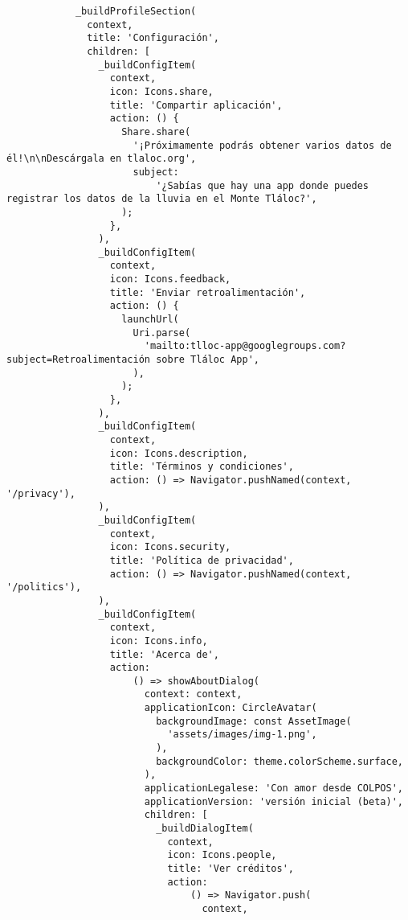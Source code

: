 \begin{verbatim}
            _buildProfileSection(
              context,
              title: 'Configuración',
              children: [ 
                _buildConfigItem(
                  context,
                  icon: Icons.share,
                  title: 'Compartir aplicación',
                  action: () {
                    Share.share(
                      '¡Próximamente podrás obtener varios datos de él!\n\nDescárgala en tlaloc.org',
                      subject:
                          '¿Sabías que hay una app donde puedes registrar los datos de la lluvia en el Monte Tláloc?',
                    );
                  },
                ),
                _buildConfigItem(
                  context,
                  icon: Icons.feedback,
                  title: 'Enviar retroalimentación',
                  action: () {
                    launchUrl(
                      Uri.parse(
                        'mailto:tlloc-app@googlegroups.com?subject=Retroalimentación sobre Tláloc App',
                      ),
                    );
                  },
                ),
                _buildConfigItem(
                  context,
                  icon: Icons.description,
                  title: 'Términos y condiciones',
                  action: () => Navigator.pushNamed(context, '/privacy'),
                ),
                _buildConfigItem(
                  context,
                  icon: Icons.security,
                  title: 'Política de privacidad',
                  action: () => Navigator.pushNamed(context, '/politics'),
                ),
                _buildConfigItem(
                  context,
                  icon: Icons.info,
                  title: 'Acerca de',
                  action:
                      () => showAboutDialog(
                        context: context,
                        applicationIcon: CircleAvatar(
                          backgroundImage: const AssetImage(
                            'assets/images/img-1.png',
                          ),
                          backgroundColor: theme.colorScheme.surface,
                        ),
                        applicationLegalese: 'Con amor desde COLPOS',
                        applicationVersion: 'versión inicial (beta)',
                        children: [
                          _buildDialogItem(
                            context,
                            icon: Icons.people,
                            title: 'Ver créditos',
                            action:
                                () => Navigator.push(
                                  context,

\end{verbatim}
